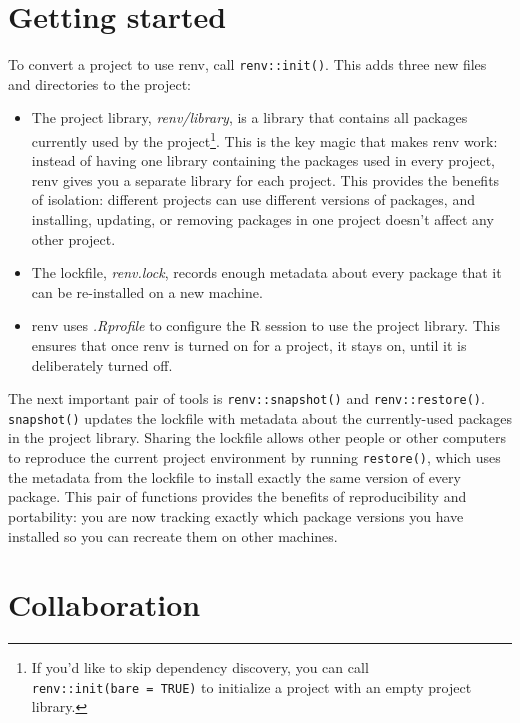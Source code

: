 \documentclass[
  letterpaper,
  DIV=11,
  numbers=noendperiod]{scrreport}
\begin{document}
\section{Getting started}\label{getting-started}

To convert a project to use renv, call \texttt{renv::init()}. This adds
three new files and directories to the project:

\begin{itemize}
\item
  The project library, \emph{renv/library}, is a library that contains
  all packages currently used by the project\footnote{If you'd like to
    skip dependency discovery, you can call
    \texttt{renv::init(bare\ =\ TRUE)} to initialize a project with an
    empty project library.}. This is the key magic that makes renv work:
  instead of having one library containing the packages used in every
  project, renv gives you a separate library for each project. This
  provides the benefits of isolation: different projects can use
  different versions of packages, and installing, updating, or removing
  packages in one project doesn't affect any other project.
\item
  The lockfile, \emph{renv.lock}, records enough metadata about every
  package that it can be re-installed on a new machine.
\item
  renv uses \emph{.Rprofile} to configure the R session to use the
  project library. This ensures that once renv is turned on for a
  project, it stays on, until it is deliberately turned off.
\end{itemize}

The next important pair of tools is \texttt{renv::snapshot()} and
\texttt{renv::restore()}. \texttt{snapshot()} updates the lockfile with
metadata about the currently-used packages in the project library.
Sharing the lockfile allows other people or other computers to reproduce
the current project environment by running \texttt{restore()}, which
uses the metadata from the lockfile to install exactly the same version
of every package. This pair of functions provides the benefits of
reproducibility and portability: you are now tracking exactly which
package versions you have installed so you can recreate them on other
machines.

\section{Collaboration}\label{collaboration}
\end{document}
